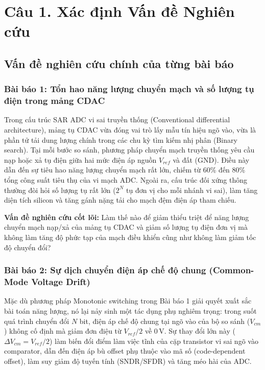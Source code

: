 \documentclass[12pt,a4paper]{article}
\begin{document}
\section{Câu 1. Xác định Vấn đề Nghiên cứu}

\subsection{Vấn đề nghiên cứu chính của từng bài báo}

\subsubsection{Bài báo 1: Tổn hao năng lượng chuyển mạch và số lượng tụ điện trong mảng CDAC}
Trong cấu trúc SAR ADC vi sai truyền thống (Conventional differential architecture), mảng tụ CDAC vừa đóng vai trò lấy mẫu tín hiệu ngõ vào, vừa là phần tử tải dung lượng chính trong các chu kỳ tìm kiếm nhị phân (Binary search). Tại mỗi bước so sánh, phương pháp chuyển mạch truyền thống yêu cầu nạp hoặc xả tụ điện giữa hai mức điện áp nguồn $V_{ref}$ và đất (GND). Điều này dẫn đến sự tiêu hao năng lượng chuyển mạch rất lớn, chiếm từ 60\% đến 80\% tổng công suất tiêu thụ của vi mạch ADC. Ngoài ra, cấu trúc đối xứng thông thường đòi hỏi số lượng tụ rất lớn ($2^N$ tụ đơn vị cho mỗi nhánh vi sai), làm tăng diện tích silicon và tăng gánh nặng tải cho mạch đệm điện áp tham chiếu.

\textbf{Vấn đề nghiên cứu cốt lõi:} Làm thế nào để giảm thiểu triệt để năng lượng chuyển mạch nạp/xả của mảng tụ CDAC và giảm số lượng tụ điện đơn vị mà không làm tăng độ phức tạp của mạch điều khiển cũng như không làm giảm tốc độ chuyển đổi?

\subsubsection{Bài báo 2: Sự dịch chuyển điện áp chế độ chung (Common-Mode Voltage Drift)}
Mặc dù phương pháp Monotonic switching trong Bài báo 1 giải quyết xuất sắc bài toán năng lượng, nó lại nảy sinh một tác dụng phụ nghiêm trọng: trong suốt quá trình chuyển đổi $N$ bit, điện áp chế độ chung tại ngõ vào của bộ so sánh ($V_{cm}$) không cố định mà giảm đơn điệu từ $V_{ref}/2$ về $0\,\text{V}$. Sự thay đổi lớn này ($\Delta V_{cm} = V_{ref}/2$) làm biến đổi điểm làm việc tĩnh của cặp transistor vi sai ngõ vào comparator, dẫn đến điện áp bù offset phụ thuộc vào mã số (code-dependent offset), làm suy giảm độ tuyến tính (SNDR/SFDR) và tăng méo hài của ADC.
\end{document}
